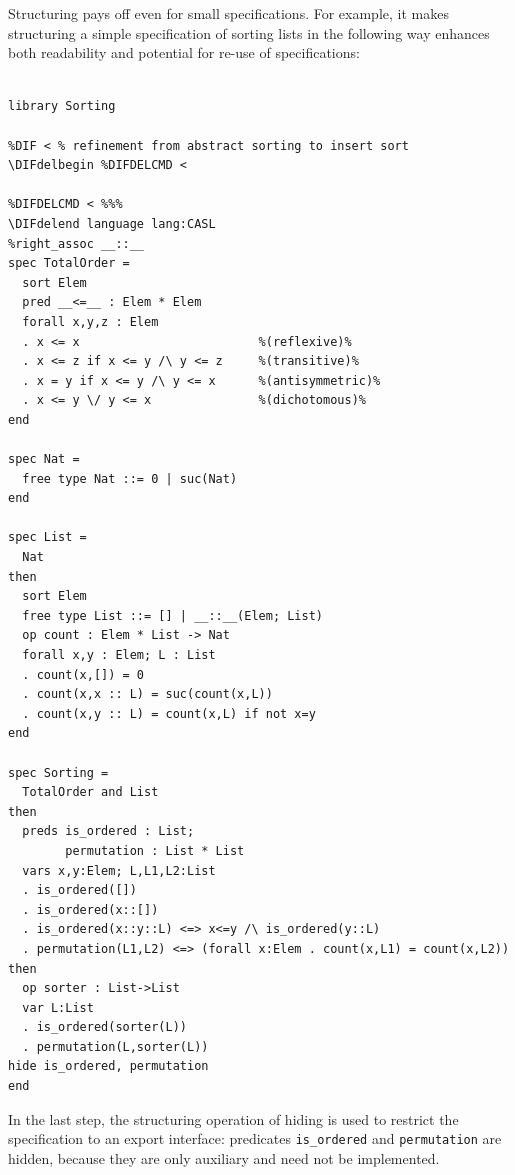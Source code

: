 \documentclass[10pt,fleqn,final]{scrreprt}
\newenvironment{definitions}[0]{\medskip }{}
\providecommand{\DIFaddbegin}{} %
\providecommand{\DIFaddend}{} %
\providecommand{\DIFdelbegin}{} %
\providecommand{\DIFdelend}{} %
\begin{document}
\begin{definitions}
Structuring pays off even for small specifications. For example, it makes
structuring a simple specification of sorting lists in the 
following way enhances both readability and potential for re-use
of specifications:

\DIFdelbegin %
\DIFdelend \DIFaddbegin \begin{lstlisting}[basicstyle=\ttfamily\footnotesize,language=dolText,alsolanguage=CASL,escapechar=@,mathescape]	
\DIFaddend %prefix( lang:  <http://purl.net/DOL/languages/> )%

library Sorting

%DIF < % refinement from abstract sorting to insert sort
\DIFdelbegin %DIFDELCMD < 

%DIFDELCMD < %%%
\DIFdelend language lang:CASL
%right_assoc __::__
spec TotalOrder =
  sort Elem
  pred __<=__ : Elem * Elem
  forall x,y,z : Elem
  . x <= x                         %(reflexive)%
  . x <= z if x <= y /\ y <= z     %(transitive)%
  . x = y if x <= y /\ y <= x      %(antisymmetric)%
  . x <= y \/ y <= x               %(dichotomous)%
end

spec Nat =
  free type Nat ::= 0 | suc(Nat)
end

spec List =
  Nat
then
  sort Elem
  free type List ::= [] | __::__(Elem; List)
  op count : Elem * List -> Nat
  forall x,y : Elem; L : List
  . count(x,[]) = 0
  . count(x,x :: L) = suc(count(x,L))
  . count(x,y :: L) = count(x,L) if not x=y
end

spec Sorting =
  TotalOrder and List
then
  preds is_ordered : List;
        permutation : List * List
  vars x,y:Elem; L,L1,L2:List
  . is_ordered([])
  . is_ordered(x::[])
  . is_ordered(x::y::L) <=> x<=y /\ is_ordered(y::L)
  . permutation(L1,L2) <=> (forall x:Elem . count(x,L1) = count(x,L2))
then
  op sorter : List->List
  var L:List
  . is_ordered(sorter(L))
  . permutation(L,sorter(L))
hide is_ordered, permutation
end
\end{lstlisting}

In the last step, the structuring operation of hiding is used to
restrict the specification to an export interface: 
 predicates \texttt{is\_ordered} and \texttt{permutation} are hidden, because they
are only auxiliary and need not be implemented.



\end{definitions}
\end{document}
